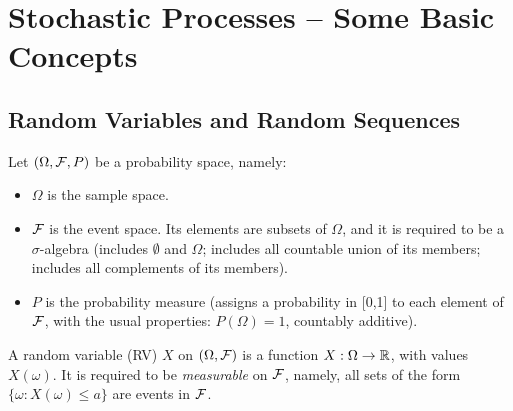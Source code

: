 %
%
%
%
%
%
%
%
%

\newcommand{\midarrow}{\to}
\newcommand{\uu}{\underline}
\newcommand{\oo}{\overline}
\newcommand{\limn}{\lim_{n \to \infty}}
\newcommand{\limsupn}{\limsup_{n \to \infty}}

\section{Stochastic Processes -- Some Basic Concepts}

\subsection{Random Variables and Random Sequences}

Let $(\Omega,\mathcal F,P)$ be a probability space, namely:
\begin{itemize}
\item $\Omega$ is the sample space.
\item $\mathcal F$ is the event space. Its elements are subsets
of $\Omega$, and it is required to be a $\sigma$-algebra
(includes $\emptyset$ and $\Omega$; includes all countable union of its members;
includes all complements of its members).
\item $P$ is the probability measure (assigns a probability in [0,1] to each element
of $\mathcal F$, with the usual properties: $P(\Omega)=1$, countably additive).
\end{itemize}

A random variable (RV) $X$ on $(\Omega,\mathcal F)$
is a function $X:\Omega \to \mathbb{R}$, with values $X(\omega)$.
It is required to be {\em measurable} on $\mathcal F$,
namely, all sets of the form $\{\omega: X(\omega)\le a\}$ are
events in $\mathcal F$.

